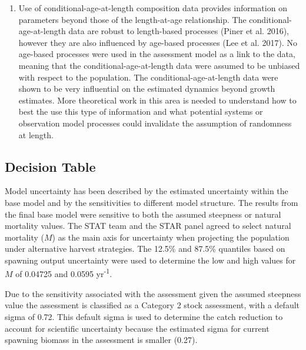 \documentclass[12pt,]{article}
\begin{document}
\begin{enumerate}
\item Use of conditional-age-at-length composition data provides information on parameters beyond those of the length-at-age relationship. The conditional-age-at-length data are robust to length-based processes (Piner et al. 2016), however they are also influenced by age-based processes (Lee et al. 2017). No age-based processes were used in the assessment model as a link to the data, meaning that the conditional-age-at-length data were assumed to be unbiased with respect to the population. The conditional-age-at-length data were shown to be very influential on the estimated dynamics beyond growth estimates. More theoretical work in this area is needed to understand how to best the use this type of information and what potential systems or observation model processes could invalidate the assumption of randomness at length.

\end{enumerate}

\subsection*{Decision Table}\label{decision-table}

Model uncertainty has been described by the estimated uncertainty within
the base model and by the sensitivities to different model structure.
The results from the final base model were sensitive to both the assumed
steepness or natural mortality values. The STAT team and the STAR panel
agreed to select natural mortality (\(M\)) as the main axis for
uncertainty when projecting the population under alternative harvest
strategies. The 12.5\% and 87.5\% quantiles based on spawning output
uncertainty were used to determine the low and high values for \(M\) of
0.04725 and 0.0595 yr\textsuperscript{-1}.

Due to the sensitivity associated with the assessment given the assumed
steepness value the assessment is classified as a Category 2 stock
assessment, with a default sigma of 0.72. This default sigma is used to
determine the catch reduction to account for scientific uncertainty
because the estimated sigma for current spawning biomass in the
assessment is smaller (0.27).
\end{document}
